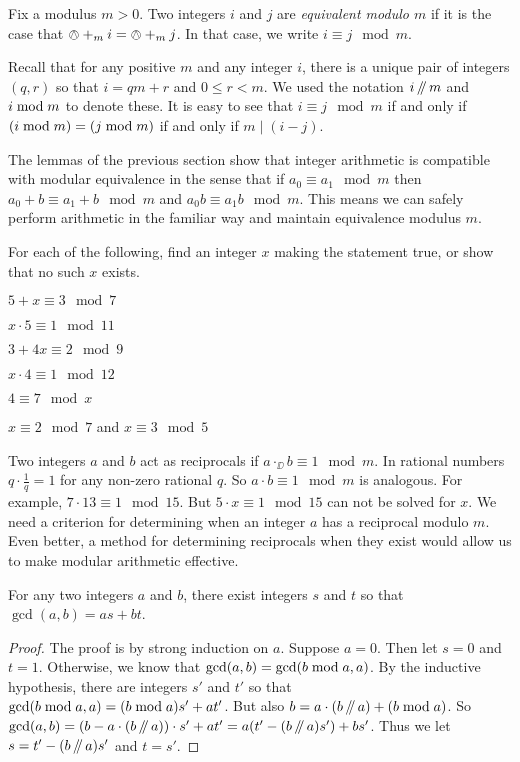 \begin{defn}\label{def:modulus}
	Fix a modulus $m>0$. Two integers $i$ and $j$ are \emph{equivalent modulo $m$} if it is the case that $\owedge +_m i = \owedge +_m j$. In that case, we write $i\equiv j\mod m$. 
\end{defn}

Recall that for any positive $m$ and any integer $i$, there is a unique pair of integers $(q,r)$ so that $i = qm + r$ and $0\leq r < m$. We used the notation $i\mathop{/\mkern-5mu/} m$ and $i\bmod m$ to denote these. It is easy to see that
$i \equiv j \mod m$ if and only if $(i\bmod m)=(j\bmod m)$ if and only if $m\mid (i-j)$.

The lemmas of the previous section show that integer arithmetic is compatible with modular equivalence in the sense that if $a_0\equiv a_1\mod m$ then $a_0 + b \equiv a_1 + b\mod m$ and $a_0b\equiv a_1b\mod m$. This means we can safely perform arithmetic in the familiar way and maintain equivalence modulus $m$. 

\begin{exer}
	For each of the following, find an integer $x$ making the statement true, or show that no such $x$ exists.
	\begin{exercise}
		\item $5 + x \equiv 3 \mod 7$
		\item $x\cdot 5\equiv 1 \mod 11$
		\item $3 + 4x \equiv 2\mod 9$
		\item $x\cdot 4 \equiv 1\mod 12$
		\item $4 \equiv 7 \mod x$
		\item $x\equiv 2\mod 7$ and $x\equiv 3\mod 5$
	\end{exercise}
\end{exer}

Two integers $a$ and $b$ act as reciprocals if $a \cdot_\DD b\equiv 1\mod m$.
In rational numbers $q\cdot \frac1q = 1$ for any non-zero rational $q$.
So $a\cdot b\equiv 1\mod m$ is analogous.
For example, $7\cdot 13 \equiv 1\mod 15$.
But $5\cdot x \equiv 1\mod 15$ can not be solved for $x$.
We need a criterion for determining when an integer $a$ has a reciprocal modulo $m$.
Even better, a method for determining reciprocals when they exist would allow us to make modular arithmetic effective. 

\begin{lem}
	For any two integers $a$ and $b$, there exist integers $s$ and $t$ so that $\gcd(a,b)=as+bt$.
	
	\begin{proof}
		The proof is by strong induction on $a$. 
		Suppose $a=0$.
		Then let $s=0$ and $t=1$.
		Otherwise, we know that $\gcd(a,b)=\gcd(b\bmod a, a)$.
		By the inductive hypothesis, there are integers $s'$ and $t'$
		so that $\gcd(b\bmod a, a)= (b\bmod a)s'+at'$.
		But also $b = a\cdot(b\mathop{/\mkern-5mu/} a)+(b\bmod a)$.
		So $\gcd(a,b) = (b-a\cdot(b\mathop{/\mkern-5mu/} a))\cdot s' + at'= a(t'-(b\mathop{/\mkern-5mu/} a)s') + bs'$.
		Thus we let $s=t'-(b\mathop{/\mkern-5mu/} a)s'$ and $t=s'$.
	\end{proof}
\end{lem}


